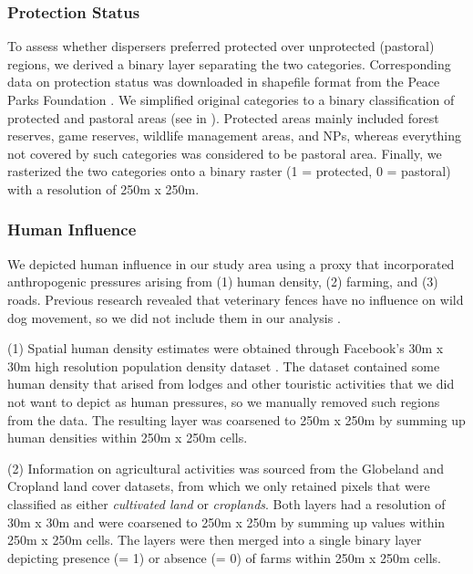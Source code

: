 \documentclass[abstract=on,10pt,a4paper,bibliography=totocnumbered]{scrartcl}
\begin{document}
\subsubsection{Protection Status}
To assess whether dispersers preferred protected over unprotected (pastoral)
regions, we derived a binary layer separating the two categories. Corresponding
data on protection status was downloaded in shapefile format from the Peace
Parks Foundation \citep{PeaceParks.2019}. We simplified original categories to a
binary classification of protected and pastoral areas (see
 in ). Protected areas
mainly included forest reserves, game reserves, wildlife management areas, and
NPs, whereas everything not covered by such categories was considered to be
pastoral area. Finally, we rasterized the two categories onto a binary raster (1
= protected, 0 = pastoral) with a resolution of 250m x 250m.

\subsubsection{Human Influence}
We depicted human influence in our study area using a proxy that incorporated
anthropogenic pressures arising from (1) human density, (2) farming, and (3)
roads. Previous research revealed that veterinary fences have no influence on
wild dog movement, so we did not include them in our analysis
\citep{Cozzi.2013b}.

(1) Spatial human density estimates were obtained through Facebook's 30m x 30m
high resolution population density dataset \citep{Facebook.2019}. The dataset
contained some human density that arised from lodges and other touristic
activities that we did not want to depict as human pressures, so we manually
removed such regions from the data. The resulting layer was coarsened to 250m x
250m by summing up human densities within 250m x 250m cells.

(2) Information on agricultural activities was sourced from the Globeland
\citep{Chen.2015} and Cropland \citep{Xiong.2017} land cover datasets, from
which we only retained pixels that were classified as either \textit{cultivated
land} or \textit{croplands}. Both layers had a resolution of 30m x 30m and were
coarsened to 250m x 250m by summing up values within 250m x 250m cells. The
layers were then merged into a single binary layer depicting presence (= 1) or
absence (= 0) of farms within 250m x 250m cells.
\end{document}
